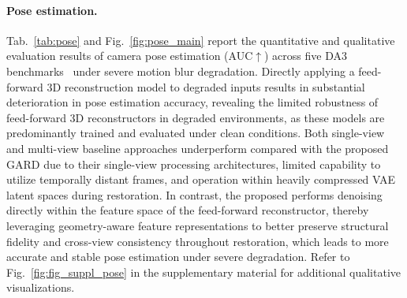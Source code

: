 \paragraph{Pose estimation.}
Tab.~\ref{tab:pose} and Fig.~\ref{fig:pose_main} report the quantitative and qualitative evaluation results of camera pose estimation (AUC$\uparrow$) across five DA3 benchmarks~\cite{depthanything3} under severe motion blur degradation. Directly applying a feed-forward 3D reconstruction model to degraded inputs results in substantial deterioration in pose estimation accuracy, revealing the limited robustness of feed-forward 3D reconstructors in degraded environments, as these models are predominantly trained and evaluated under clean conditions. Both single-view and multi-view baseline approaches underperform compared with the proposed GARD due to their single-view processing architectures, limited capability to utilize temporally distant frames, and operation within heavily compressed VAE latent spaces during restoration. In contrast, the proposed \ourmodel{} performs denoising directly within the feature space of the feed-forward reconstructor, thereby leveraging geometry-aware feature representations to better preserve structural fidelity and cross-view consistency throughout restoration, which leads to more accurate and stable pose estimation under severe degradation. Refer to Fig.~\ref{fig:fig_suppl_pose} in the supplementary material for additional qualitative visualizations.


